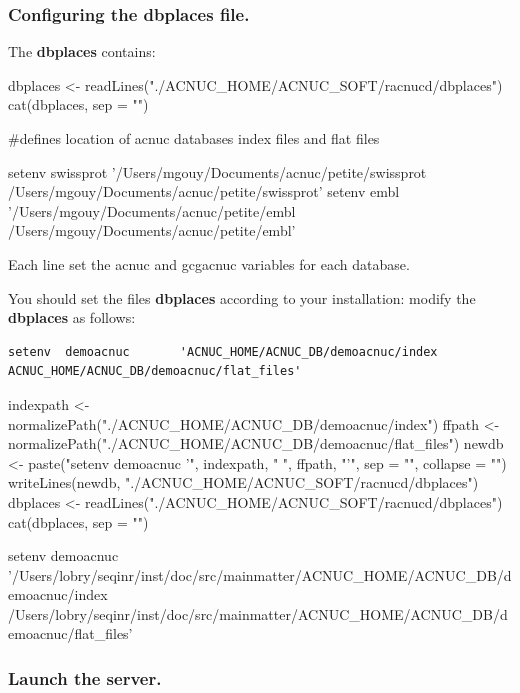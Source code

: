 \documentclass{article}
\begin{document}
\subsubsection{Configuring the dbplaces file.}


The \textbf{dbplaces} contains:

\begin{Schunk}
\begin{Sinput}
 dbplaces <- readLines("./ACNUC_HOME/ACNUC_SOFT/racnucd/dbplaces")
 cat(dbplaces, sep = "\n")
\end{Sinput}
\begin{Soutput}
#defines location of acnuc databases index files and flat files

setenv 	swissprot 	'/Users/mgouy/Documents/acnuc/petite/swissprot /Users/mgouy/Documents/acnuc/petite/swissprot'
setenv 	embl 	'/Users/mgouy/Documents/acnuc/petite/embl /Users/mgouy/Documents/acnuc/petite/embl'
\end{Soutput}
\end{Schunk}

Each line set the acnuc and gcgacnuc variables for each   database.


You should set the files \textbf{dbplaces}  according to your installation:
 modify  the \textbf{dbplaces} as follows:
\begin{verbatim}
setenv  demoacnuc       'ACNUC_HOME/ACNUC_DB/demoacnuc/index ACNUC_HOME/ACNUC_DB/demoacnuc/flat_files'
\end{verbatim}

\begin{Schunk}
\begin{Sinput}
 indexpath <- normalizePath("./ACNUC_HOME/ACNUC_DB/demoacnuc/index")
 ffpath <- normalizePath("./ACNUC_HOME/ACNUC_DB/demoacnuc/flat_files")
 newdb <- paste("setenv demoacnuc '", indexpath, " ", ffpath, 
     "'", sep = "", collapse = "")
 writeLines(newdb, "./ACNUC_HOME/ACNUC_SOFT/racnucd/dbplaces")
 dbplaces <- readLines("./ACNUC_HOME/ACNUC_SOFT/racnucd/dbplaces")
 cat(dbplaces, sep = "\n")
\end{Sinput}
\begin{Soutput}
setenv demoacnuc '/Users/lobry/seqinr/inst/doc/src/mainmatter/ACNUC_HOME/ACNUC_DB/demoacnuc/index /Users/lobry/seqinr/inst/doc/src/mainmatter/ACNUC_HOME/ACNUC_DB/demoacnuc/flat_files'
\end{Soutput}
\end{Schunk}

\subsubsection{Launch the server.}
\end{document}
